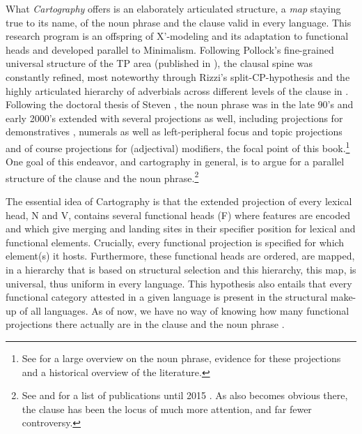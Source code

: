 \documentclass [output=book,colorlinks,citecolor=brown]{langscibook}
\begin{document}
What \textit{Cartography} offers is an elaborately articulated structure, a \textit{map} staying true to its name, of the noun phrase and the clause valid in every language. This research program is an offspring of X'-modeling and its adaptation to functional heads \citep{chomsky:1986:barriers} and developed parallel to Minimalism. Following Pollock’s fine-grained universal structure of the TP area (published in \citealt{pollock:1989:verb}), the clausal spine was constantly refined, most noteworthy through Rizzi’s split-CP-hypothesis \citep{rizzi:1997:the} and the highly articulated hierarchy of adverbials across different levels of the clause in \citet{cinque:1999:adverbs}. Following the doctoral thesis of Steven \citet{abney:1987:the}, the noun phrase was in the late 90’s and early 2000’s extended with several projections as well, including projections for demonstratives \citep{bruge:2002:positions}, numerals \citep{ritter:1991:two, ritter:1993:where} as well as left-peripheral focus and topic projections \citep{dimitrova:1998:fragments, ihsane:2001:specific, aboh:2004:topic, aboh:2006:when} and of course projections for (adjectival) modifiers, the focal point of this book.\footnote{See \citet{alex:2007:nounphrase} for a large overview on the noun phrase, evidence for these projections and a historical overview of the literature.} One goal of this endeavor, and cartography in general, is to argue for a parallel structure of the clause and the noun phrase.\footnote{See \citet{cinque:1993:evidence, cinque:1999:adverbs, cinque:2010:adj, cinque:2020:relcl, rizzi:1997:the, rizzi:2004:the, cinriz:2010:carto} and for a list of publications until 2015 \citet[144–151]{cinriz:2016:functional}. As also becomes obvious there, the clause has been the locus of much more attention, and far fewer controversy.}

The essential idea of Cartography is that the extended projection of every lexical head, N and V, contains several functional heads (F) where features are encoded and which give merging and landing sites in their specifier position for lexical and functional elements. Crucially, every functional projection is specified for which element(s) it hosts. Furthermore, these functional heads are ordered, are mapped, in a hierarchy that is based on structural selection and this hierarchy, this map, is universal, thus uniform in every language. This hypothesis also entails that every functional category attested in a given language is present in the structural make-up of all languages. As of now, we have no way of knowing how many functional projections there actually are in the clause and the noun phrase \citep[154–157]{cinriz:2016:functional}.
\end{document}

